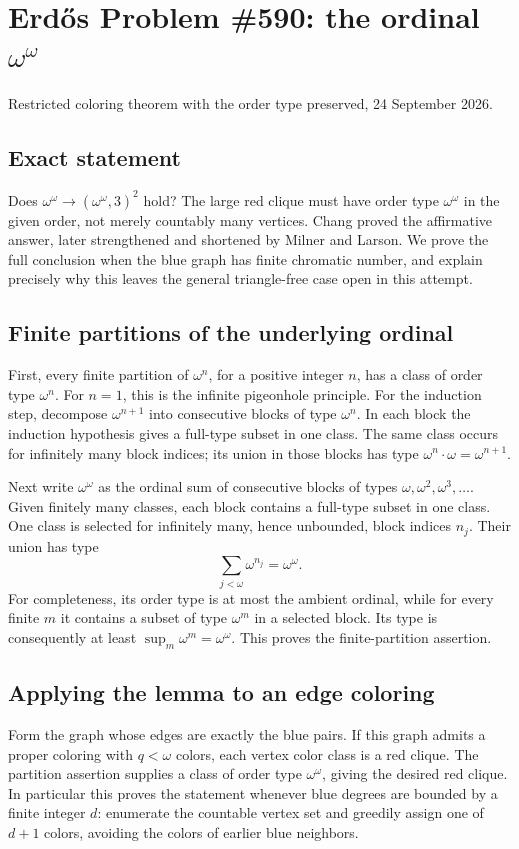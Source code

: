 \section{Erd\H{o}s Problem \#590: the ordinal $\omega^\omega$}
\noindent Restricted coloring theorem with the order type preserved, 24 September 2026.

\subsection*{Exact statement}
Does $\omega^\omega\to(\omega^\omega,3)^2$ hold? The large red clique must have order type $\omega^\omega$ in the given order, not merely countably many vertices. Chang proved the affirmative answer, later strengthened and shortened by Milner and Larson. We prove the full conclusion when the blue graph has finite chromatic number, and explain precisely why this leaves the general triangle-free case open in this attempt.

\subsection*{Finite partitions of the underlying ordinal}
First, every finite partition of $\omega^n$, for a positive integer $n$, has a class of order type $\omega^n$. For $n=1$, this is the infinite pigeonhole principle. For the induction step, decompose $\omega^{n+1}$ into consecutive blocks of type $\omega^n$. In each block the induction hypothesis gives a full-type subset in one class. The same class occurs for infinitely many block indices; its union in those blocks has type $\omega^n\cdot\omega=\omega^{n+1}$.

Next write $\omega^\omega$ as the ordinal sum of consecutive blocks of types $\omega,\omega^2,\omega^3,\ldots$. Given finitely many classes, each block contains a full-type subset in one class. One class is selected for infinitely many, hence unbounded, block indices $n_j$. Their union has type
\[\sum_{j<\omega}\omega^{n_j}=\omega^\omega.
\]
For completeness, its order type is at most the ambient ordinal, while for every finite $m$ it contains a subset of type $\omega^m$ in a selected block. Its type is consequently at least $\sup_m\omega^m=\omega^\omega$. This proves the finite-partition assertion.

\subsection*{Applying the lemma to an edge coloring}
Form the graph whose edges are exactly the blue pairs. If this graph admits a proper coloring with $q<\omega$ colors, each vertex color class is a red clique. The partition assertion supplies a class of order type $\omega^\omega$, giving the desired red clique. In particular this proves the statement whenever blue degrees are bounded by a finite integer $d$: enumerate the countable vertex set and greedily assign one of $d+1$ colors, avoiding the colors of earlier blue neighbors.

